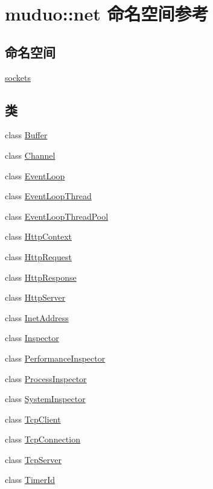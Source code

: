 \hypertarget{namespacemuduo_1_1net}{}\section{muduo\+:\+:net 命名空间参考}
\label{namespacemuduo_1_1net}
\subsection*{命名空间}
\begin{DoxyCompactItemize}
\item 
 \hyperlink{namespacemuduo_1_1net_1_1sockets}{sockets}
\end{DoxyCompactItemize}
\subsection*{类}
\begin{DoxyCompactItemize}
\item 
class \hyperlink{classmuduo_1_1net_1_1Buffer}{Buffer}
\item 
class \hyperlink{classmuduo_1_1net_1_1Channel}{Channel}
\item 
class \hyperlink{classmuduo_1_1net_1_1EventLoop}{Event\+Loop}
\item 
class \hyperlink{classmuduo_1_1net_1_1EventLoopThread}{Event\+Loop\+Thread}
\item 
class \hyperlink{classmuduo_1_1net_1_1EventLoopThreadPool}{Event\+Loop\+Thread\+Pool}
\item 
class \hyperlink{classmuduo_1_1net_1_1HttpContext}{Http\+Context}
\item 
class \hyperlink{classmuduo_1_1net_1_1HttpRequest}{Http\+Request}
\item 
class \hyperlink{classmuduo_1_1net_1_1HttpResponse}{Http\+Response}
\item 
class \hyperlink{classmuduo_1_1net_1_1HttpServer}{Http\+Server}
\item 
class \hyperlink{classmuduo_1_1net_1_1InetAddress}{Inet\+Address}
\item 
class \hyperlink{classmuduo_1_1net_1_1Inspector}{Inspector}
\item 
class \hyperlink{classmuduo_1_1net_1_1PerformanceInspector}{Performance\+Inspector}
\item 
class \hyperlink{classmuduo_1_1net_1_1ProcessInspector}{Process\+Inspector}
\item 
class \hyperlink{classmuduo_1_1net_1_1SystemInspector}{System\+Inspector}
\item 
class \hyperlink{classmuduo_1_1net_1_1TcpClient}{Tcp\+Client}
\item 
class \hyperlink{classmuduo_1_1net_1_1TcpConnection}{Tcp\+Connection}
\item 
class \hyperlink{classmuduo_1_1net_1_1TcpServer}{Tcp\+Server}
\item 
class \hyperlink{classmuduo_1_1net_1_1TimerId}{Timer\+Id}
\end{DoxyCompactItemize}
